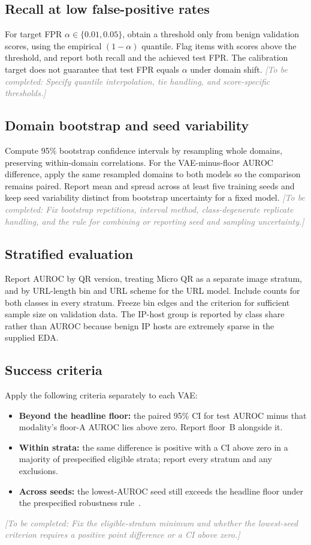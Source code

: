 \documentclass{article}
\newcommand{\pending}[1]{\textcolor{gray}{\textit{[To be completed: #1]}}}
\begin{document}
\subsection{Recall at low false-positive rates}
For target FPR $\alpha\in\{0.01,0.05\}$, obtain a threshold only from benign validation scores, using the empirical $(1-\alpha)$ quantile.
Flag items with scores above the threshold, and report both recall and the achieved test FPR.
The calibration target does not guarantee that test FPR equals $\alpha$ under domain shift.
\pending{Specify quantile interpolation, tie handling, and score-specific thresholds.}

\subsection{Domain bootstrap and seed variability}
Compute 95\% bootstrap confidence intervals by resampling whole domains, preserving within-domain correlations.
For the VAE-minus-floor AUROC difference, apply the same resampled domains to both models so the comparison remains paired.
Report mean and spread across at least five training seeds and keep seed variability distinct from bootstrap uncertainty for a fixed model.
\pending{Fix bootstrap repetitions, interval method, class-degenerate replicate handling, and the rule for combining or reporting seed and sampling uncertainty.}

\subsection{Stratified evaluation}
Report AUROC by QR version, treating Micro QR as a separate image stratum, and by URL-length bin and URL scheme for the URL model.
Include counts for both classes in every stratum.
Freeze bin edges and the criterion for sufficient sample size on validation data.
The IP-host group is reported by class share rather than AUROC because benign IP hosts are extremely sparse in the supplied EDA.

\subsection{Success criteria}
Apply the following criteria separately to each VAE:
\begin{itemize}
  \item \textbf{Beyond the headline floor:} the paired 95\% CI for test AUROC minus that modality's floor-A AUROC lies above zero. Report floor~B alongside it.
  \item \textbf{Within strata:} the same difference is positive with a CI above zero in a majority of prespecified eligible strata; report every stratum and any exclusions.
  \item \textbf{Across seeds:} the lowest-AUROC seed still exceeds the headline floor under the prespecified robustness rule~\citep{bouman}.
\end{itemize}
\pending{Fix the eligible-stratum minimum and whether the lowest-seed criterion requires a positive point difference or a CI above zero.}
\end{document}
